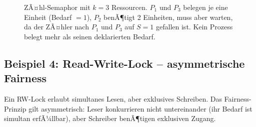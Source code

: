 ﻿\documentclass[a4paper,12pt]{article}
\theoremstyle{definition}
\begin{document}
\begin{figure}[H]
\caption{ZÃ¤hl-Semaphor mit $k=3$ Ressourcen. $P_1$ und $P_3$ belegen
  je eine Einheit (Bedarf $= 1$), $P_2$ benÃ¶tigt 2 Einheiten, muss
  aber warten, da der ZÃ¤hler nach $P_1$ und $P_3$ auf $S=1$ gefallen
  ist. Kein Prozess belegt mehr als seinen deklarierten Bedarf.}
\label{fig:tikz3}
\end{figure}

\subsection{Beispiel 4: Read-Write-Lock -- asymmetrische Fairness}

Ein RW-Lock erlaubt simultanes Lesen, aber exklusives Schreiben.
Das Fairness-Prinzip gilt asymmetrisch: Leser konkurrieren nicht
untereinander (ihr Bedarf ist simultan erfÃ¼llbar), aber Schreiber
benÃ¶tigen exklusiven Zugang.
\end{document}
